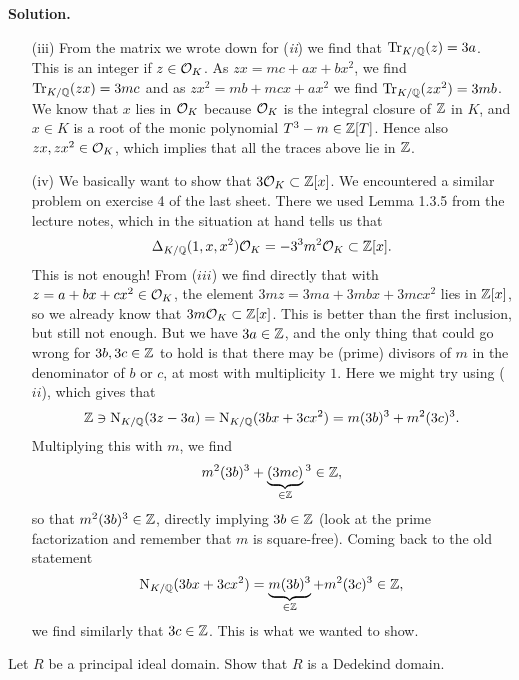 \documentclass[a4paper,11pt]{article}
\begin{document}
\textbf{Solution.}
\begin{itemize}[wide, labelindent=0pt]
\item[(iii)] From the matrix we wrote down for (\textit{ii}) we find
        that $\operatorname{Tr}_{K/\mathbb{Q}}(z) = 3a$. This is an integer if $z \in \mathcal{O}_K$.  As $zx
        = mc + ax + bx^2$, we find
        $\operatorname{Tr}_{K/\mathbb{Q}}(zx) = 3mc$ and as $zx^2 = mb + mcx + ax^2$ we find
        $\operatorname{Tr}_{K/\mathbb{Q}}(zx^2) = 3mb$. We know that $x$ lies in $\mathcal{O}_K$ because $\mathcal{O}_K$
        is the integral closure of $\mathbb{Z}$ in $K$, and $x \in K$ is a root of the monic
        polynomial $T^3 - m \in \mathbb{Z}[T]$. Hence also $zx , zx^2 \in \mathcal{O}_K$,
        which implies that all the traces above lie in $\mathbb{Z}$. 
    \item[(iv)] We basically want to show that $3\mathcal{O}_K \subset \mathbb{Z}[x]$. We
        encountered a similar problem on exercise 4 of the last
        sheet. There we used Lemma 1.3.5 from the lecture notes, which in the
        situation at hand tells us that
        \begin{equation*}
            \Delta_{K/\mathbb{Q}}(1,x,x^2)\mathcal{O}_K = -3^3m^2 \mathcal{O}_K \subset \mathbb{Z}[x].
        \end{equation*}
        This is not enough!  
        From ($iii$) we find directly
        that with $z = a + bx +cx^2 \in \mathcal{O}_K$, the element $3mz =3ma +  3mbx +
        3mcx^2$ lies in $\mathbb{Z}[x]$, so we
        already know that $3m \mathcal{O}_K \subset \mathbb{Z}[x]$. This is better than the 
        first inclusion, but still not enough. But we have $3a \in \mathbb{Z}$, and the only
        thing that could go wrong for $3b, 3c \in \mathbb{Z}$ to hold is that there may be
        (prime) divisors of $m$ in the denominator of $b$ or $c$, at most
        with multiplicity $1$. Here we might try using ($ii$), which gives that 
        $$\mathbb{Z} \ni \operatorname{N}_{K/\mathbb{Q}}(3z-3a) = \operatorname{N}_{K/\mathbb{Q}}(3bx + 3cx^2) = m(3b)^3 + m^2 (3c)^3.$$
        Multiplying this with $m$, we find
        $$ m^2(3b)^3 + \underbrace{(3mc)}_{\in \mathbb{Z}}{}^3 \in \mathbb{Z},$$
        so that $m^2(3b)^3 \in \mathbb{Z}$, directly implying $3b \in \mathbb{Z}$ (look at the
        prime factorization and remember that $m$ is square-free). 
        Coming back to the old statement
        \begin{equation*}
            \operatorname{N}_{K/\mathbb{Q}}(3bx + 3cx^2) = \underbrace{m(3b)^3}_{\in \mathbb{Z}} + m^2(3c)^3 \in \mathbb{Z},
        \end{equation*}
        we find similarly that $3c \in \mathbb{Z}$. This is what we wanted to show.
\end{itemize}



 Let $R$ be a principal ideal domain. Show that $R$ is a Dedekind
domain.
\end{document}
